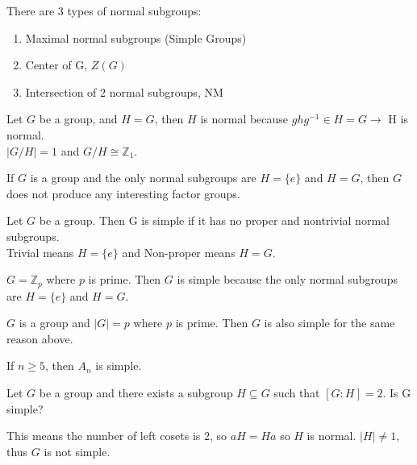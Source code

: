 
\begin{note}
There are 3 types of normal subgroups:
\begin{enumerate}
    \item Maximal normal subgroups (Simple Groups)
    \item Center of G, $Z(G)$
    \item Intersection of 2 normal subgroups, NM
\end{enumerate}
\end{note}

\begin{eg}
Let $G$ be a group, and $H = G$, then $H$ is normal because $ghg^{-1} \in H = G \to$ H is normal.\\
 $|G/H| = 1$ and $G/H \cong \mathbb{Z}_1$.
\end{eg}

\begin{remark}
If $G$ is a group and the only normal subgroups are $H = \{e\}$ and $H = G$, then $G$ does not produce any interesting factor groups.
\end{remark}

\begin{theorem}
Let $G$ be a group. Then G is simple if it has no proper and nontrivial normal subgroups.\\
Trivial means $H = \{e\}$ and Non-proper means $H = G$.
\end{theorem}

\begin{eg}
    $G = \mathbb{Z}_p$ where $p$ is prime. Then $G$ is simple because the only normal subgroups are $H = \{e\}$ and $H = G$.
\end{eg}

\begin{eg}
    $G$ is a group and $|G| = p$ where $p$ is prime. Then $G$ is also simple for the same reason above.
\end{eg}

\begin{theorem}
If $n \geq 5$, then $A_n$ is simple.
\end{theorem}

\begin{eg}
Let $G$ be a group and there exists a subgroup $H \subseteq G$ such that $[G:H] = 2$. Is G simple?\\
\end{eg}
\begin{answer}
    This means the number of left cosets is 2, so $aH = Ha$ so $H$ is normal. $|H| \neq 1$, thus $G$ is not simple.
\end{answer}

